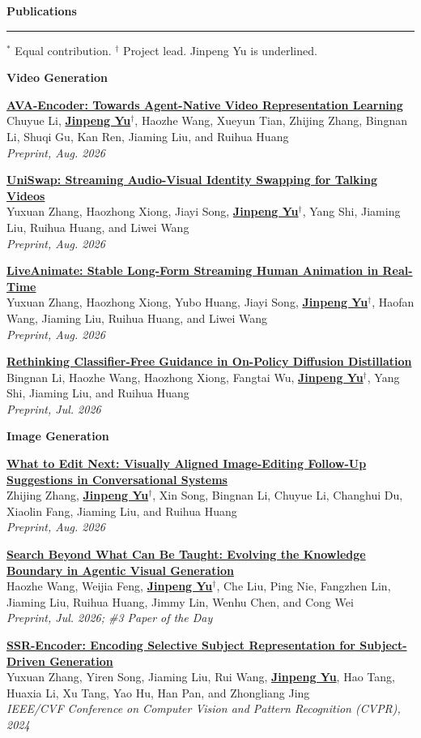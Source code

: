\documentclass{resume}
\renewenvironment{rSection}[1]{
\sectionskip
\textcolor{DefaultBlack}{\bf #1}
\sectionlineskip
\hrule
\begin{list}{}{
\setlength{\leftmargin}{0em}
}
\item[]
}{
\end{list}
\vspace{-0.25em}
}
\newcommand{\pubentry}[3]{
{{\fontsize{10.8}{13}\selectfont\bfseries #1}}\\[-0.15em]
#2\\[-0.15em]
{\em #3}\par\vspace{0.3em}
}
\begin{document}
\begin{rSection}{Publications}
\small{$^*$ Equal contribution. $^\dagger$ Project lead. Jinpeng Yu is underlined.}

\vspace{0.25em}
\textbf{Video Generation}

\pubentry{\href{https://ava-encoder.github.io/}{AVA-Encoder: Towards Agent-Native Video Representation Learning}}
{Chuyue Li, \underline{\bf Jinpeng Yu$^\dagger$}, Haozhe Wang, Xueyun Tian, Zhijing Zhang, Bingnan Li, Shuqi Gu, Kan Ren, Jiaming Liu, and Ruihua Huang}
{Preprint, Aug. 2026}

\pubentry{\href{https://uniswap-av.github.io/}{UniSwap: Streaming Audio-Visual Identity Swapping for Talking Videos}}
{Yuxuan Zhang, Haozhong Xiong, Jiayi Song, \underline{\bf Jinpeng Yu$^\dagger$}, Yang Shi, Jiaming Liu, Ruihua Huang, and Liwei Wang}
{Preprint, Aug. 2026}

\pubentry{\href{https://liveanimate.github.io/}{LiveAnimate: Stable Long-Form Streaming Human Animation in Real-Time}}
{Yuxuan Zhang, Haozhong Xiong, Yubo Huang, Jiayi Song, \underline{\bf Jinpeng Yu$^\dagger$}, Haofan Wang, Jiaming Liu, Ruihua Huang, and Liwei Wang}
{Preprint, Aug. 2026}

\pubentry{\href{https://rethinking-cfg-opd.github.io/}{Rethinking Classifier-Free Guidance in On-Policy Diffusion Distillation}}
{Bingnan Li, Haozhe Wang, Haozhong Xiong, Fangtai Wu, \underline{\bf Jinpeng Yu$^\dagger$}, Yang Shi, Jiaming Liu, and Ruihua Huang}
{Preprint, Jul. 2026}

\textbf{Image Generation}

\pubentry{\href{https://what-to-edit-next.github.io/}{What to Edit Next: Visually Aligned Image-Editing Follow-Up Suggestions in Conversational Systems}}
{Zhijing Zhang, \underline{\bf Jinpeng Yu$^\dagger$}, Xin Song, Bingnan Li, Chuyue Li, Changhui Du, Xiaolin Fang, Jiaming Liu, and Ruihua Huang}
{Preprint, Aug. 2026}

\pubentry{\href{https://haozheh3.github.io/SearchGen/}{Search Beyond What Can Be Taught: Evolving the Knowledge Boundary in Agentic Visual Generation}}
{Haozhe Wang, Weijia Feng, \underline{\bf Jinpeng Yu$^\dagger$}, Che Liu, Ping Nie, Fangzhen Lin, Jiaming Liu, Ruihua Huang, Jimmy Lin, Wenhu Chen, and Cong Wei}
{Preprint, Jul. 2026; \#3 Paper of the Day}

\pubentry{\href{https://ssr-encoder.github.io/}{SSR-Encoder: Encoding Selective Subject Representation for Subject-Driven Generation}}
{Yuxuan Zhang, Yiren Song, Jiaming Liu, Rui Wang, \underline{\bf Jinpeng Yu}, Hao Tang, Huaxia Li, Xu Tang, Yao Hu, Han Pan, and Zhongliang Jing}
{IEEE/CVF Conference on Computer Vision and Pattern Recognition (CVPR), 2024}


\end{rSection}
\end{document}

